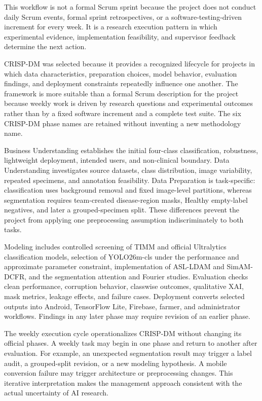 This workflow is not a formal Scrum sprint because the project does not conduct daily Scrum events, formal sprint retrospectives, or a software-testing-driven increment for every week. It is a research execution pattern in which experimental evidence, implementation feasibility, and supervisor feedback determine the next action.\par
CRISP-DM was selected because it provides a recognized lifecycle for projects in which data characteristics, preparation choices, model behavior, evaluation findings, and deployment constraints repeatedly influence one another. The framework is more suitable than a formal Scrum description for the project because weekly work is driven by research questions and experimental outcomes rather than by a fixed software increment and a complete test suite. The six CRISP-DM phase names are retained without inventing a new methodology name.\par
Business Understanding establishes the initial four-class classification, robustness, lightweight deployment, intended users, and non-clinical boundary. Data Understanding investigates source datasets, class distribution, image variability, repeated specimens, and annotation feasibility. Data Preparation is task-specific: classification uses background removal and fixed image-level partitions, whereas segmentation requires team-created disease-region masks, Healthy empty-label negatives, and later a grouped-specimen split. These differences prevent the project from applying one preprocessing assumption indiscriminately to both tasks.\par
Modeling includes controlled screening of TIMM and official Ultralytics classification models, selection of YOLO26m-cls under the performance and approximate parameter constraint, implementation of ASL-LDAM and SimAM-DCFR, and the segmentation attention and Fourier studies. Evaluation checks clean performance, corruption behavior, classwise outcomes, qualitative XAI, mask metrics, leakage effects, and failure cases. Deployment converts selected outputs into Android, TensorFlow Lite, Firebase, farmer, and administrator workflows. Findings in any later phase may require revision of an earlier phase.\par
The weekly execution cycle operationalizes CRISP-DM without changing its official phases. A weekly task may begin in one phase and return to another after evaluation. For example, an unexpected segmentation result may trigger a label audit, a grouped-split revision, or a new modeling hypothesis. A mobile conversion failure may trigger architecture or preprocessing changes. This iterative interpretation makes the management approach consistent with the actual uncertainty of AI research.\par
